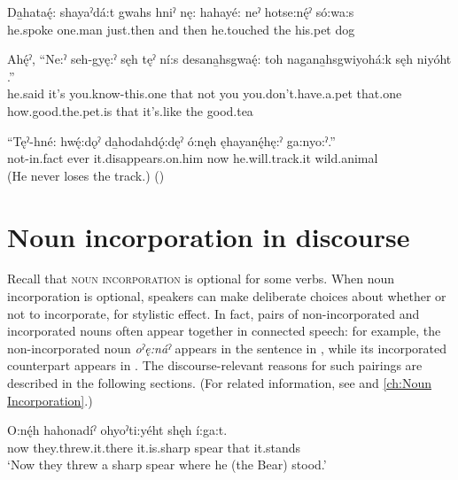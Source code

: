 \ea\label{ex:flexwordex18}
\ea\label{ex:flexwordex18a} 
\gll Da̱hataę́: shayaˀdá:t gwahs hniˀ nę: hahayé: neˀ hotse:nę́ˀ só:wa:s\\
he.spoke one.man just.then and then he.touched the  his.pet dog\\
\glt {}

\ex \label{ex:flexwordex18b}
\gll Ahę́ˀ, “Ne:ˀ seh-gyę:ˀ sęh tęˀ ní:s desana̱hsgwaę́: toh nagana̱hsgwiyohá:k sęh niyóht  .”\\
he.said it’s you.know-this.one that not you you.don’t.have.a.pet that.one how.good.the.pet.is that it’s.like the good.tea\\
\glt {}

\ex \label{ex:flexwordex18c}
\gll “Tęˀ-hné: hwę́:dǫˀ da̱hodahdǫ́:dęˀ ó:nęh ęhayanę́hę:ˀ ga:nyo:ˀ.”\\
not-in.fact ever it.disappears.on.him now he.will.track.it wild.animal\\
\glt  {} (He never loses the track.) (\cite{keye_hnyagwaidatgigowah_2012})
\z
\z 


\chapter{Noun incorporation in discourse} \label{ch:Noun incorporation in discourse}
Recall that \textsc{noun incorporation} is optional for some verbs. When noun incorporation is optional, speakers can make deliberate choices about whether or not to incorporate, for stylistic effect. In fact, pairs of non-incorporated and incorporated nouns often appear together in connected speech: for example, the non-incorporated noun \textit{oˀę:náˀ} appears in the sentence in , while its incorporated counterpart  appears in . The discourse-relevant reasons for such pairings are described in the following sections. (For related information, see  and \ref{ch:Noun Incorporation}.)

\ea\label{ex:nounincdiscex} 
\ea \label{ex:nounincdiscexa} 
 \gll O:nę́h hahonadíˀ ohyoˀti:yéht  shęh í:ga:t.\\
now they.threw.it.there it.is.sharp spear that it.stands\\
\glt ‘Now they threw a sharp spear where he (the Bear) stood.’


